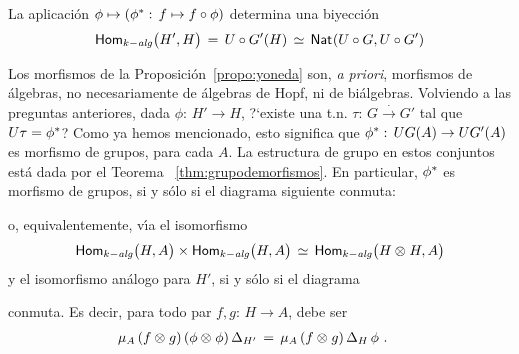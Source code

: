 \begin{propoYoneda}\label{propo:yoneda}
	La aplicaci\'{o}n $\phi\mapsto(\pull\phi:\,f\mapsto f\circ\phi)$
	determina una biyecci\'{o}n
	\begin{equation}
		\label{eq:yoneda}
		\Homalg\big(H',H\big)\,=\,U\circ G'(H) \,\simeq\,
			\Nat(U\circ G,U\circ G')
	\end{equation}
\end{propoYoneda}

Los morfismos de la Proposici\'{o}n~\ref{propo:yoneda} son, \emph{a priori},
morfismos de \'{a}lgebras, no necesariamente de \'{a}lgebras de Hopf, ni de
bi\'{a}lgebras. Volviendo a las preguntas anteriores, dada
$\phi:\,H'\rightarrow H$, ?`existe una t.n. $\tau:\,G\xrightarrow\cdot G'$ tal
que $U\tau=\pull\phi$? Como ya hemos mencionado, esto significa que
$\pull\phi:\,UG(A)\rightarrow UG'(A)$ es morfismo de grupos, para cada $A$. La
estructura de grupo en estos conjuntos est\'{a} dada por el Teorema~%
\ref{thm:grupodemorfismos}. En particular, $\pull\phi$ es morfismo de grupos,
si y s\'{o}lo si el diagrama siguiente conmuta:
\begin{center}
\end{center}
o, equivalentemente, v\'{\i}a el isomorfismo
\begin{equation}
	\label{eq:isomorfismoproducto}
	\Homalg\big(H,A\big)\times\Homalg\big(H,A\big) \,\simeq\,
		\Homalg\big(H\tensor H,A\big)
\end{equation}
%
y el isomorfismo an\'{a}logo para $H'$, si y s\'{o}lo si el diagrama
\begin{center}
\end{center}
conmuta. Es decir, para todo par $f,g:\,H\rightarrow A$, debe ser
\begin{align*}
	\producto[A]\,(f\tensor g)\,(\phi\tensor\phi)\,\coproducto[H'] & \,=\,
		\producto[A]\,(f\tensor g)\,\coproducto[H]\,\phi
	\text{ .}
\end{align*}
